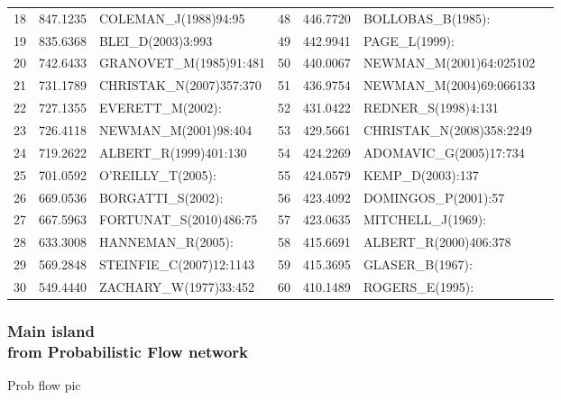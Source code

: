 \documentclass[hyperref={pdfstartview={FitBH -32768},
                         pdfpagemode=FullScreen,
                         plainpages=false,
                         colorlinks=true}
              ]{beamer}
\begin{document}
\begin{frame}[fragile]
\begin{tabular}{c|c|l||c|c|l|l}
18&   	847.1235&   	COLEMAN\_J(1988)94:95&   	48&   	446.7720&   	BOLLOBAS\_B(1985):\\
19&   	835.6368&   	BLEI\_D(2003)3:993&   	49&   	442.9941&   	PAGE\_L(1999):\\
20&   	742.6433&   	GRANOVET\_M(1985)91:481&   	50&   	440.0067&   	NEWMAN\_M(2001)64:025102\\
21&   	731.1789&   	CHRISTAK\_N(2007)357:370&   	51&   	436.9754&   	NEWMAN\_M(2004)69:066133\\
22&   	727.1355&   	EVERETT\_M(2002):&   	52&   	431.0422&   	REDNER\_S(1998)4:131\\
23&   	726.4118&   	NEWMAN\_M(2001)98:404&   	53&   	429.5661&   	CHRISTAK\_N(2008)358:2249\\
24&   	719.2622&   	ALBERT\_R(1999)401:130&   	54&   	424.2269&   	ADOMAVIC\_G(2005)17:734\\
25&   	701.0592&   	O'REILLY\_T(2005):&   	55&   	424.0579&   	KEMP\_D(2003):137\\
26&   	669.0536&   	BORGATTI\_S(2002):&   	56&   	423.4092&   	DOMINGOS\_P(2001):57\\
27&   	667.5963&   	FORTUNAT\_S(2010)486:75&   	57&   	423.0635&   	MITCHELL\_J(1969):\\
28&   	633.3008&   	HANNEMAN\_R(2005):&   	58&   	415.6691&   	ALBERT\_R(2000)406:378\\
29&   	569.2848&   	STEINFIE\_C(2007)12:1143&   	59&   	415.3695&   	GLASER\_B(1967):\\
30&   	549.4440&   	ZACHARY\_W(1977)33:452&   	60&   	410.1489&   	ROGERS\_E(1995):\\ \hline
\end{tabular}

\end{frame}


\begin{frame}[fragile]
\frametitle{Main island\\ \normalsize from Probabilistic  Flow network}
\small

Prob flow pic 

\end{frame}
\end{document}
